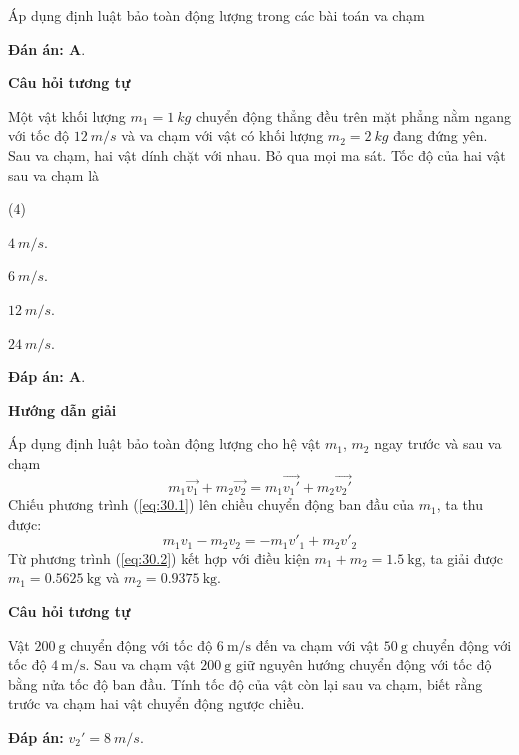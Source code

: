 \begin{dang}{Áp dụng định luật bảo toàn động lượng trong các bài toán va chạm}
{		\textbf{Đán án: A}.
		
		\begin{center}
			\textbf{Câu hỏi tương tự}
		\end{center}
		
		Một vật khối lượng $m_1=\SI{1}{kg}$ chuyển động thẳng đều trên mặt phẳng nằm ngang với tốc độ $\SI{12}{m/s}$ và va chạm với vật có khối lượng $m_2=\SI{2}{kg}$ đang đứng yên. Sau va chạm, hai vật dính chặt với nhau. Bỏ qua mọi ma sát. Tốc độ của hai vật sau va chạm là
		\begin{mcq}(4)
			\item $\SI{4}{m/s}$. 
			\item $\SI{6}{m/s}$.
			\item $\SI{12}{m/s}$.
			\item $\SI{24}{m/s}$.
		\end{mcq}
		
		\textbf{Đáp án: A}.
	}
	{	\begin{center}
			\textbf{Hướng dẫn giải}
		\end{center}
		
		Áp dụng định luật bảo toàn động lượng cho hệ vật $m_1$, $m_2$ ngay trước và sau va chạm
		\begin{equation}
			\label{eq:30.1}
			m_1\overrightarrow{v_1} + m_2\overrightarrow{v_2} = m_1\overrightarrow{v_1'} + m_2\overrightarrow{ v_2'}
		\end{equation}
	Chiếu phương trình (\ref{eq:30.1}) lên chiều chuyển động ban đầu của $m_1$, ta thu được:
	\begin{equation}
		\label{eq:30.2}
		m_1v_1-m_2v_2=-m_1v'_1+m_2v'_2
	\end{equation}
		Từ phương trình (\ref{eq:30.2}) kết hợp với điều kiện $m_1+m_2=\SI{1.5}{\kilogram}$, ta giải được $m_1=\SI{0.5625}{\kilogram}$ và $m_2=\SI{0,9375}{\kilogram}$.
		
		
		\begin{center}
			\textbf{Câu hỏi tương tự}
		\end{center}
		
		Vật $\SI{200}{\gram}$ chuyển động với tốc độ $\SI{6}{\meter/\second}$ đến va chạm với vật $\SI{50}{\gram}$ chuyển động với tốc độ $\SI{4}{\meter/\second}$. Sau va chạm vật $\SI{200}{\gram}$ giữ nguyên hướng chuyển động với tốc độ bằng nửa tốc độ ban đầu. Tính tốc độ của vật còn lại sau va chạm, biết rằng trước va chạm hai vật chuyển động ngược chiều.
		
		\textbf{Đáp án:} $v_2'=\SI{8}{m/s}$.
		
		
	}
\end{dang}

